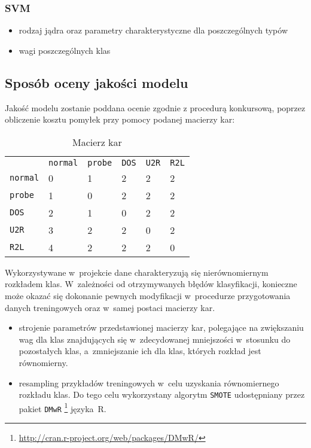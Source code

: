 \documentclass[a4paper, 12pt]{article}
\begin{document}
\subsubsection*{SVM}
\begin{itemize}
 \item rodzaj jądra oraz parametry charakterystyczne dla poszczególnych typów
 \item wagi poszczególnych klas
\end{itemize}

\subsection{Sposób oceny jakości modelu}
Jakość modelu zostanie poddana ocenie zgodnie z procedurą konkursową,
poprzez obliczenie kosztu pomyłek przy pomocy podanej macierzy kar:

\begin{table}[H]
\centering
\begin{tabular}{ l l l l l l }
       & \texttt{normal}&\texttt{probe}	&\texttt{DOS}	&\texttt{U2R}	&\texttt{R2L} \\
\texttt{normal}	&0	&1	&2	&2	&2 \\
\texttt{probe}	&1	&0	&2	&2	&2 \\
\texttt{DOS}	&2	&1	&0	&2	&2 \\
\texttt{U2R}	&3	&2	&2	&0	&2 \\
\texttt{R2L}	&4	&2	&2	&2	&0 \\
\end{tabular}
\caption{Macierz kar}
\label{table:cov_matrix}
\end{table}

Wykorzystywane w~projekcie dane charakteryzują się nierównomiernym rozkładem klas. W~zależności od otrzymywanych błędów klasyfikacji, konieczne może okazać się dokonanie pewnych modyfikacji w~procedurze przygotowania danych treningowych oraz w~samej postaci macierzy kar. 
\begin{itemize}
	\item strojenie parametrów przedstawionej macierzy kar, polegające na zwiększaniu wag dla klas znajdujących się w~zdecydowanej mniejszości w~stosunku do pozostałych klas, a~zmniejszanie ich dla klas, których rozkład jest równomierny.
	\item resampling przykładów treningowych w~celu uzyskania równomiernego rozkładu klas. Do tego celu wykorzystany algorytm \texttt{SMOTE} udostępniany przez pakiet \texttt{DMwR} \footnote{\url{http://cran.r-project.org/web/packages/DMwR/}} języka~R.
\end{itemize}

\end{document}
